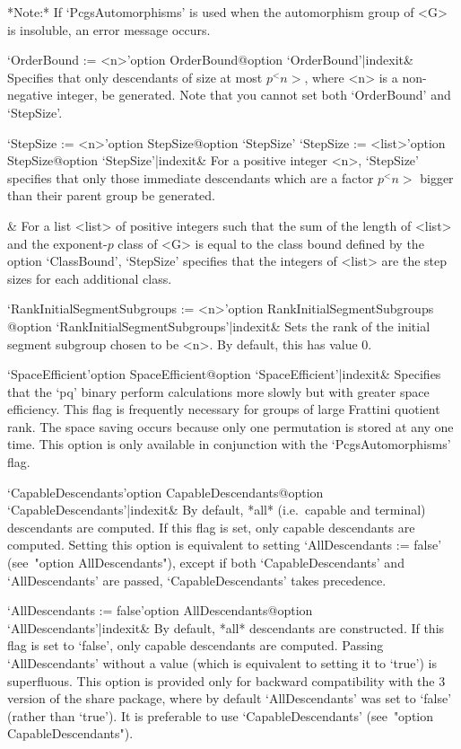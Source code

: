 *Note:*
If `PcgsAutomorphisms' is used when the  automorphism  group  of  <G>  is
insoluble, an error message occurs.

\>`OrderBound := <n>'{option OrderBound}@{option `OrderBound'|indexit}&
Specifies that only descendants of size at most $p^<n>$, where <n>  is  a
non-negative integer,  be  generated.  Note  that  you  cannot  set  both
`OrderBound' and `StepSize'.

\>`StepSize := <n>'{option StepSize}@{option `StepSize'}
\>`StepSize := <list>'{option StepSize}@{option `StepSize'|indexit}&
For  a  positive  integer  <n>,  `StepSize'  specifies  that  only  those
immediate descendants which are a factor $p^<n>$ bigger than their parent
group be generated.

&
For a list <list> of positive integers such that the sum of the length of
<list> and the exponent-$p$ class of <G> is  equal  to  the  class  bound
defined  by  the  option  `ClassBound',  `StepSize'  specifies  that  the
integers of <list> are the step sizes for each additional class.

\>`RankInitialSegmentSubgroups := <n>'{option RankInitialSegmentSubgroups}%
@{option `RankInitialSegmentSubgroups'|indexit}&
Sets the rank of the initial  segment  subgroup  chosen  to  be  <n>.  By
default, this has value 0.

\>`SpaceEfficient'{option SpaceEfficient}@{option `SpaceEfficient'|indexit}&
Specifies that the `pq' binary perform calculations more slowly but  with
greater space efficiency. This flag is frequently necessary for groups of
large Frattini quotient rank. The space saving occurs  because  only  one
permutation is stored at any one time. This option is only  available  in
conjunction with the `PcgsAutomorphisms' flag.

\>`CapableDescendants'{option CapableDescendants}@{option `CapableDescendants'|indexit}&
By default, *all* (i.e.~capable and terminal) descendants  are  computed.
If this flag is set, only capable descendants are computed. Setting  this
option is equivalent to setting `AllDescendants  :=  false'  (see~"option
AllDescendants"),    except    if    both    `CapableDescendants'     and
`AllDescendants' are passed, `CapableDescendants' takes precedence.

\>`AllDescendants := false'{option AllDescendants}@{option `AllDescendants'|indexit}&
By default, *all* descendants are constructed. If this  flag  is  set  to
`false', only capable descendants are computed. Passing  `AllDescendants'
without a value  (which  is  equivalent  to  setting  it  to  `true')  is
superfluous. This option is provided only for backward compatibility with
the {\GAP} 3 version of the {\ANUPQ}  share  package,  where  by  default
`AllDescendants'  was  set  to  `false'  (rather  than  `true').  It   is
preferable to use `CapableDescendants' (see~"option CapableDescendants").

